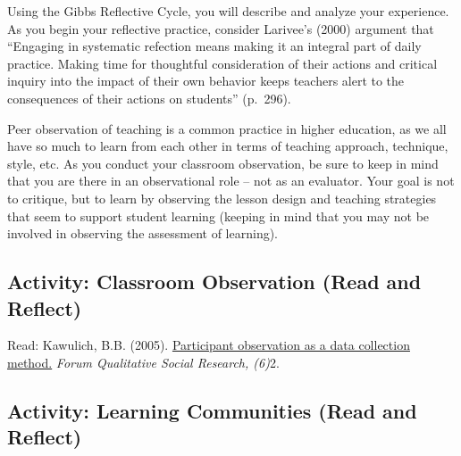 \documentclass[
]{book}
\begin{document}
Using the Gibbs Reflective Cycle, you will describe and analyze your experience. As you begin your reflective practice, consider Larivee's (2000) argument that ``Engaging in systematic refection means making it an integral part of daily practice. Making time for thoughtful consideration of their actions and critical inquiry into the impact of their own behavior keeps teachers alert to the consequences of their actions on students'' (p.~296).

Peer observation of teaching is a common practice in higher education, as we all have so much to learn from each other in terms of teaching approach, technique, style, etc. As you conduct your classroom observation, be sure to keep in mind that you are there in an observational role -- not as an evaluator. Your goal is not to critique, but to learn by observing the lesson design and teaching strategies that seem to support student learning (keeping in mind that you may not be involved in observing the assessment of learning).

\hypertarget{activity-classroom-observation-read-and-reflect}{%
\subsection*{Activity: Classroom Observation (Read and Reflect)}\label{activity-classroom-observation-read-and-reflect}}

\begin{reflect}
Read: Kawulich, B.B. (2005). \href{http://www.qualitative-research.net/index.php/fqs/article/view/466/996}{Participant observation as a data collection method.} \emph{Forum Qualitative Social Research, (6)}2.
\end{reflect}

\hypertarget{activity-learning-communities-read-and-reflect}{%
\subsection*{Activity: Learning Communities (Read and Reflect)}\label{activity-learning-communities-read-and-reflect}}
\end{document}
